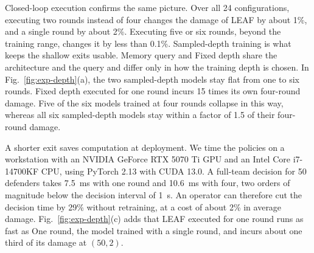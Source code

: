 Closed-loop execution confirms the same picture. Over all 24 configurations, executing two rounds instead of four changes the damage of LEAF by about 1\%, and a single round by about 2\%. Executing five or six rounds, beyond the training range, changes it by less than 0.1\%. Sampled-depth training is what keeps the shallow exits usable. Memory query and Fixed depth share the architecture and the query and differ only in how the training depth is chosen. In Fig.~\ref{fig:exp-depth}(a), the two sampled-depth models stay flat from one to six rounds. Fixed depth executed for one round incurs 15 times its own four-round damage. Five of the six models trained at four rounds collapse in this way, whereas all six sampled-depth models stay within a factor of 1.5 of their four-round damage.

A shorter exit saves computation at deployment. We time the policies on a workstation with an NVIDIA GeForce RTX 5070 Ti GPU and an Intel Core i7-14700KF CPU, using PyTorch 2.13 with CUDA 13.0. A full-team decision for 50 defenders takes 7.5~ms with one round and 10.6~ms with four, two orders of magnitude below the decision interval of 1~s. An operator can therefore cut the decision time by 29\% without retraining, at a cost of about 2\% in average damage. Fig.~\ref{fig:exp-depth}(c) adds that LEAF executed for one round runs as fast as One round, the model trained with a single round, and incurs about one third of its damage at $(50,2)$.
